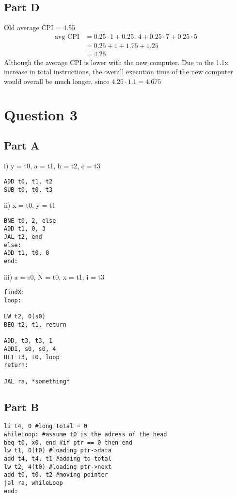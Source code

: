 \documentclass[letter]{article}
\theoremstyle{case}
\begin{document}
\subsection*{Part D}
Old average CPI = 4.55
\begin{align*}
\text{avg CPI} &= 0.25 \cdot 1 + 0.25 \cdot 4 + 0.25 \cdot 7 + 0.25 \cdot 5 \\
&= 0.25 + 1 + 1.75 + 1.25\\
&= 4.25
\end{align*}
Although the average CPI is lower with the new computer. Due to the 1.1x increase in total instructions, the overall execution time of the new computer would overall be much longer, since $4.25 \cdot 1.1 = 4.675$
\section*{Question 3}
\subsection*{Part A}
i) y = t0, a = t1, b = t2, c = t3
\begin{verbatim}
ADD t0, t1, t2
SUB t0, t0, t3
\end{verbatim}
ii) x = t0, y = t1
\begin{verbatim}
BNE t0, 2, else
ADD t1, 0, 3
JAL t2, end
else:
ADD t1, t0, 0
end:
\end{verbatim}
iii) a = s0, N = t0, x = t1, i = t3
\begin{verbatim}
findX: 
loop:

LW t2, 0(s0)
BEQ t2, t1, return

ADD, t3, t3, 1
ADDI, s0, s0, 4
BLT t3, t0, loop
return:

JAL ra, *something*
\end{verbatim}
\subsection*{Part B}
\begin{verbatim}
li t4, 0 #long total = 0
whileLoop: #assume t0 is the adress of the head
beq t0, x0, end #if ptr == 0 then end
lw t1, 0(t0) #loading ptr->data
add t4, t4, t1 #adding to total
lw t2, 4(t0) #loading ptr->next
add t0, t0, t2 #moving pointer
jal ra, whileLoop
end:
\end{verbatim}
\end{document}
